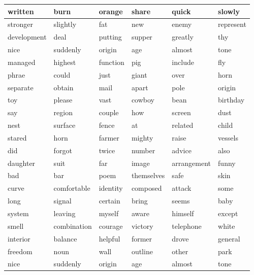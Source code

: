 \documentclass{jcls}
\begin{document}
\begin{longtable}{@{}llllll@{}}
	\toprule
	written     & burn        & orange   & share      & quick       & slowly    \\* \midrule
	\endhead
	\bottomrule
	\endfoot
	\endlastfoot
	stronger    & slightly    & fat      & new        & enemy       & represent \\
	development & deal        & putting  & supper     & greatly     & thy       \\
	nice        & suddenly    & origin   & age        & almost      & tone      \\
	managed     & highest     & function & pig        & include     & fly       \\
	phrae       & could       & just     & giant      & over        & horn      \\
	separate    & obtain      & mail     & apart      & pole        & origin    \\
	toy         & please      & vast     & cowboy     & bean        & birthday  \\
	say         & region      & couple   & how        & screen      & dust      \\
	nest        & surface     & fence    & at         & related     & child     \\
	stared      & horn        & farmer   & mighty     & raise       & vessels   \\
	did         & forgot      & twice    & number     & advice      & also      \\
	daughter    & suit        & far      & image      & arrangement & funny     \\
	bad         & bar         & poem     & themselves & safe        & skin      \\
	curve       & comfortable & identity & composed   & attack      & some      \\
	long        & signal      & certain  & bring      & seems       & baby      \\
	system      & leaving     & myself   & aware      & himself     & except    \\
	smell       & combination & courage  & victory    & telephone   & white     \\
	interior    & balance     & helpful  & former     & drove       & general   \\
	freedom     & noun        & wall     & outline    & other       & park      \\
	nice        & suddenly    & origin   & age        & almost      & tone      \\

\end{longtable}
\end{document}
